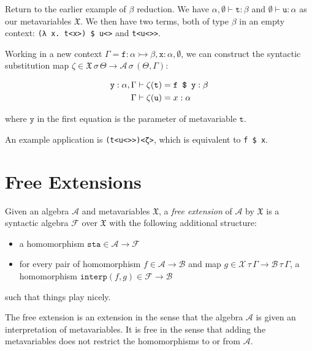\documentclass[11pt,a4paper]{article}
\newcommand*\ctxext[2]{{#1}, {#2}}
\newcommand*\ctxcons[2]{{#1}, {#2}}
\newcommand*\ctxempty[0]{\emptyset}
\newcommand*\Lapp[2]{\texttt{\ensuremath{#1} \$ \ensuremath{#2}}}
\begin{document}
Return to the earlier example of \(\beta\) reduction. We have
\(\ctxcons{\alpha}{\ctxempty} \vdash \mathtt{t} : \beta\) and \(\ctxempty \vdash \mathtt{u} : \alpha\)
as our metavariables \(\mathfrak{X}\). We then have two terms, both of type \(\beta\) in an
empty context: \verb|(λ x. t<x>) $ u<>| and \verb|t<u<>>|.

Working in a new context \(\Gamma =
{\ctxcons{\mathtt{f} : {\alpha\rightarrowtail\beta}}{\ctxcons{\mathtt{x} : \alpha}{\ctxempty}}}\), we can construct
the syntactic substitution map \(\zeta \in {{\mathfrak{X}\,\sigma\,\Theta} \to {\mathcal{A}\,\sigma\,(\ctxext{\Theta}{\Gamma})}}\):

\begin{align*}
  \ctxcons{\mathtt{y} : \alpha}{\Gamma} \vdash {\zeta(\mathtt{t})} &= \Lapp{\mathtt{f}}{\mathtt{y}}
  : \beta \\ \Gamma \vdash {\zeta(\mathtt{u})} &= x : \alpha
\end{align*}

where \(\mathtt{y}\) in the first equation is the parameter of metavariable
\(\mathtt{t}\).

An example application is \verb|(t<u<>>)<ζ>|, which is equivalent to \verb|f $ x|.

\section{Free Extensions}

Given an algebra \(\mathcal{A}\) and metavariables \(\mathfrak{X}\), a \emph{free extension} of \(\mathcal{A}\)
by \(\mathfrak{X}\) is a syntactic algebra \(\mathcal{F}\) over \(\mathfrak{X}\) with the following additional
structure:

\begin{itemize}
\item a homomorphism \(\mathtt{sta} \in {\mathcal{A}\to\mathcal{F}}\)
\item for every pair of homomorphism \(f \in {\mathcal{A}\to\mathcal{B}}\) and map \(g \in
  {{\mathcal{X}\,\tau\,\Gamma}\to{\mathcal{B}\,\tau\,\Gamma}}\), a homomorphism \(\mathtt{interp}(f,g) \in {\mathcal{F}\to\mathcal{B}}\)
\end{itemize}

such that things play nicely\footnotemark{}.


The free extension is an extension in the sense that the algebra \(\mathcal{A}\) is given
an interpretation of metavariables. It is free in the sense that adding the
metavariables does not restrict the homomorphisms to or from \(\mathcal{A}\).
\end{document}
